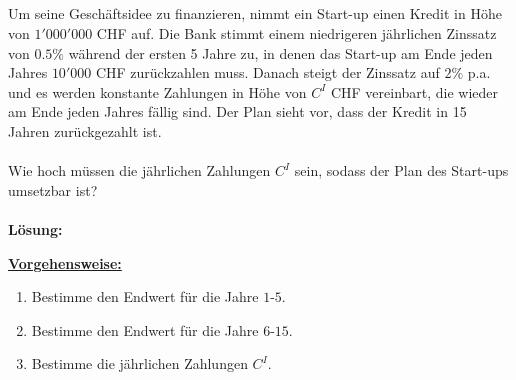 \newpage
\subsection*{}
Um seine Geschäftsidee zu finanzieren, nimmt ein Start-up einen Kredit in Höhe von
$ 1' 0 00 '0 0 0 $ CHF auf. Die Bank stimmt einem niedrigeren jährlichen Zinssatz von $ 0.5\% $
während der ersten 5 Jahre zu, in denen das Start-up am Ende jeden Jahres $ 10'000 $ CHF
zurückzahlen muss. Danach steigt der Zinssatz auf $ 2 \% $ p.a. und es werden konstante
Zahlungen in Höhe von $ C^I $ CHF vereinbart, die wieder am Ende jeden Jahres fällig sind.
Der Plan sieht vor, dass der Kredit in 15 Jahren zurückgezahlt ist.
\\
\\
Wie hoch müssen die jährlichen Zahlungen $ C^I $ sein, sodass der Plan des Start-ups umsetzbar ist?
\\
\\
\textbf{Lösung:}
\begin{mdframed}
\underline{\textbf{Vorgehensweise:}}
\begin{enumerate}
\item Bestimme den Endwert für die Jahre $ 1 $-$ 5 $.
\item Bestimme den Endwert für die Jahre $ 6$-$ 15 $.
\item Bestimme die jährlichen Zahlungen $ C^I $.
\end{enumerate}
\end{mdframed}

